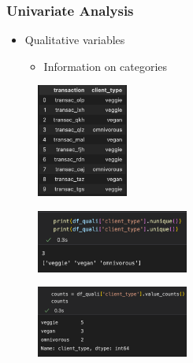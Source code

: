 
\begin{frame}\frametitle{Univariate Analysis}
   \begin{minipage}{0.48\linewidth}
      \begin{itemize}
         \item Qualitative variables
         \begin{itemize}
            \item Information on categories
         \end{itemize}
      \end{itemize}
      \vspace{.5cm}
      \begin{figure}[H]
         \includegraphics[width=3cm]{../images/illustrations/pattern_univariate_qualitative_df.png}
      \end{figure}
   \end{minipage}
   \begin{minipage}{0.48\linewidth}
      \begin{figure}[H]
         \includegraphics[width=5cm]{../images/illustrations/pattern_univariate_qualitative_uniques.png}
      \end{figure}
      \begin{figure}[H]
         \includegraphics[width=5cm]{../images/illustrations/pattern_univariate_qualitative_counts.png}
      \end{figure}
   \end{minipage}
\end{frame}


